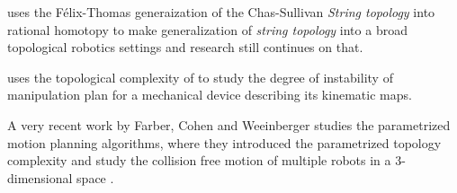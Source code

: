 \cite{derfoufi2016string} uses the F\'elix-Thomas generaization of the Chas-Sullivan \textit{String topology} into rational homotopy to make generalization of \textit{string topology} into a broad topological robotics settings and research still continues on that. 

\cite{pavesic2018topologist} uses the topological complexity of \cite{farber2003topological} to study the degree of instability of manipulation plan for a mechanical device describing its kinematic maps.

A very recent work by Farber, Cohen and Weeinberger studies the parametrized motion planning algorithms, where they introduced the parametrized topology complexity and study the collision free motion of multiple robots in a 3-dimensional space \cite{cohen2021topology}.


